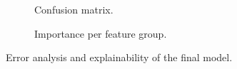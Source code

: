 \begin{figure}[h]
  \centering
  \begin{subfigure}{0.49\linewidth}
    \centering{}
    \caption{Confusion matrix.}
    \label{fig:confusion}
  \end{subfigure}\hfill
  \begin{subfigure}{0.49\linewidth}
    \centering{}
    \caption{Importance per feature group.}
    \label{fig:importance}
  \end{subfigure}
  \caption{Error analysis and explainability of the final model.}
\end{figure}
